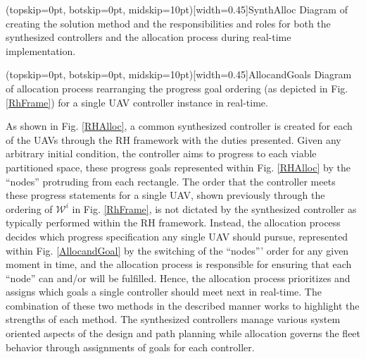 \documentclass{ieeeaccess}
\begin{document}
\Figure[t!](topskip=0pt, botskip=0pt, midskip=10pt)[width=0.45\textwidth]{SynthAlloc}
{Diagram of creating the solution method and the responsibilities and roles for both the synthesized controllers and the allocation process during real-time implementation.\label{RHAlloc}}

\Figure[t!](topskip=0pt, botskip=0pt, midskip=10pt)[width=0.45\textwidth]{AllocandGoals}
{Diagram of allocation process rearranging the progress goal ordering (as depicted in Fig. \ref{RhFrame}) for a single UAV controller instance in real-time.\label{AllocandGoal}}

As shown in Fig. \ref{RHAlloc}, a common synthesized controller is created for each of the UAVs through the RH framework with the duties presented. Given any arbitrary initial condition, the controller aims to progress to each viable partitioned space, these progress goals represented within Fig. \ref{RHAlloc} by the ``nodes'' protruding from each rectangle. The order that the controller meets these progress statements for a single UAV, shown previously through the ordering of $\mathcal{W}^i$ in Fig. \ref{RhFrame}, is not dictated by the synthesized controller as typically performed within the RH framework. Instead, the allocation process decides which progress specification any single UAV should pursue, represented within Fig. \ref{AllocandGoal} by the switching of the ``nodes''' order for any given moment in time, and the allocation process is responsible for ensuring that each ``node'' can and/or will be fulfilled. Hence, the allocation process prioritizes and assigns which goals a single controller should meet next in real-time. The combination of these two methods in the described manner works to highlight the strengths of each method. The synthesized controllers manage various system oriented aspects of the design and path planning while allocation governs the fleet behavior through assignments of goals for each controller.
\end{document}
